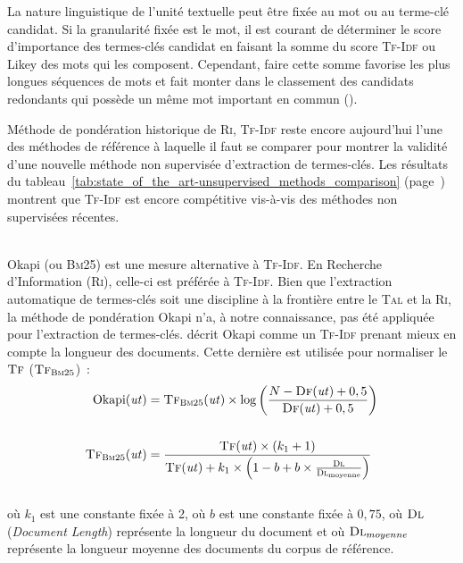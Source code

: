         La nature linguistique de l'unité textuelle peut être fixée au mot ou au
        terme-clé candidat. Si la granularité fixée est le mot, il est courant
        de déterminer le score d'importance des termes-clés candidat en faisant
        la somme du score \textsc{Tf-Idf} ou Likey des mots qui les composent.
        Cependant, faire cette somme favorise les plus longues séquences de mots
        et fait monter dans le classement des candidats redondants qui possède
        un même mot important en commun ().

        Méthode de pondération historique de \textsc{Ri}, \textsc{Tf-Idf} reste
        encore aujourd'hui l'une des méthodes de référence à laquelle il faut se
        comparer pour montrer la validité d'une nouvelle méthode non supervisée
        d'extraction de termes-clés. Les résultats du
        tableau~\ref{tab:state_of_the_art-unsupervised_methods_comparison}
        (page~\pageref{tab:state_of_the_art-unsupervised_methods_comparison})
        montrent que \textsc{Tf-Idf} est encore compétitive vis-à-vis des
        méthodes non supervisées récentes.

        ~\\Okapi (ou \textsc{Bm}25) \cite{robertson1999okapi} est une mesure
        alternative à \textsc{Tf-Idf}. En Recherche d'Information (\textsc{Ri}),
        celle-ci est préférée à \textsc{Tf-Idf}. Bien que l'extraction
        automatique de termes-clés soit une discipline à la frontière entre le
        \textsc{Tal} et la \textsc{Ri}, la méthode de pondération Okapi n'a, à
        notre connaissance, pas été appliquée pour l'extraction de termes-clés.
         décrit Okapi comme un \textsc{Tf-Idf}
        prenant mieux en compte la longueur des documents. Cette dernière est
        utilisée pour normaliser le $\textsc{Tf}$
        ($\textsc{Tf}_{\textsc{Bm}25}$)~:
        \begin{align}
          \text{Okapi}(\text{\textit{ut}}) &= \textsc{Tf}_{\textsc{Bm}25}(\text{\textit{ut}}) \times \log\left(\frac{N - \textsc{Df}(\text{\textit{ut}}) + 0,5}{\textsc{Df}(\text{\textit{ut}}) + 0,5}\right) \label{math:okapi}\\
          \notag\\
          \textsc{Tf}_{\textsc{Bm}25}(\text{\textit{ut}}) &= \frac{\textsc{Tf}(\text{\textit{ut}}) \times (k_1 + 1)}{\textsc{Tf}(\text{\textit{ut}}) + k_1 \times \left(1 - b + b \times \frac{\textsc{Dl}}{\textsc{Dl}_{\text{moyenne}}}\right)} \label{math:tf_bm25}
        \end{align}\\
        où $k_1$ est une constante fixée à 2, où $b$ est une constante fixée à
        $0,75$, où $\textsc{Dl}$ (\textit{Document Length}) représente la
        longueur du document et où $\textsc{Dl}_{moyenne}$ représente la
        longueur moyenne des documents du corpus de référence.

